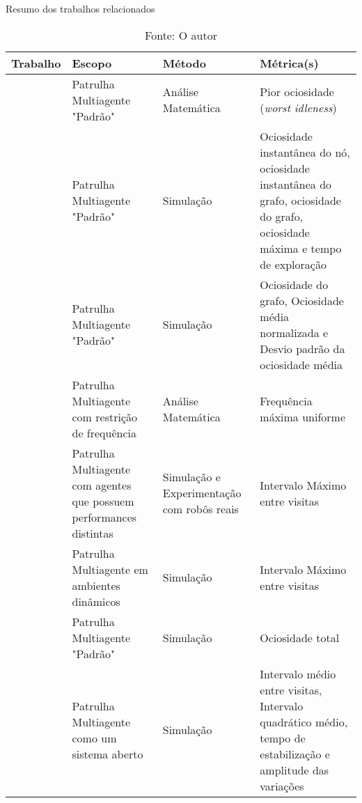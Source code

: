 \begin{table}[tp]
	\centering
	\caption{Resumo dos trabalhos relacionados}
	\label{tbl:comp_background}
	\begin{tabularx}{\linewidth}{X X X X}
		\toprule
		\textbf{Trabalho} & \textbf{Escopo} & \textbf{Método} & \textbf{Métrica(s)} \\
		\toprule
		\citep{Chevaleyre:2004:TAM:1018411.1019013} & Patrulha Multiagente "Padrão" & Análise Matemática & Pior ociosidade (\textit{worst idleness}) \\
		\citep{Machado:2002:MPE:1765317.1765332} & Patrulha Multiagente "Padrão" & Simulação & Ociosidade instantânea do nó, ociosidade instantânea do grafo, ociosidade do grafo, ociosidade máxima e tempo de exploração \\
		\citep{Almeida:2004:AAI} & Patrulha Multiagente "Padrão" & Simulação & Ociosidade do grafo, Ociosidade média normalizada e Desvio padrão da ociosidade média \\
		\citep{4209122} & Patrulha Multiagente com restrição de frequência & Análise Matemática & Frequência máxima uniforme \\
		\citep{Pippin:2013:PBT:2480362.2480378} & Patrulha Multiagente com agentes que possuem performances distintas & Simulação e Experimentação com robôs reais & Intervalo Máximo entre visitas \\
		\citep{6615158} & Patrulha Multiagente em ambientes dinâmicos & Simulação & Intervalo Máximo entre visitas \\
		\citep{hernandez2013game} & Patrulha Multiagente "Padrão" & Simulação & Ociosidade total \\
		\citep{6495145} & Patrulha Multiagente como um sistema aberto & Simulação & Intervalo médio entre visitas, Intervalo quadrático médio, tempo de estabilização e amplitude das variações \\
		\bottomrule
	\end{tabularx}
	\caption*{Fonte: O autor}
\end{table}